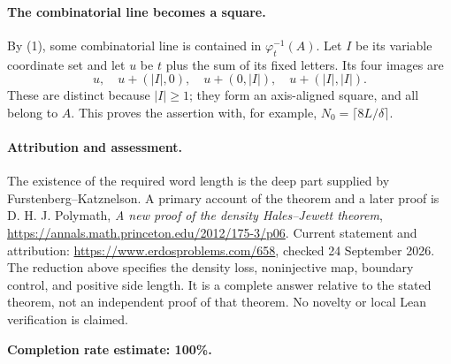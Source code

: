 \paragraph{The combinatorial line becomes a square.}
By (1), some combinatorial line is contained in \(\varphi_t^{-1}(A)\). Let \(I\) be its variable coordinate set and let \(u\) be \(t\) plus the sum of its fixed letters. Its four images are
\[
 u,\quad u+(|I|,0),\quad u+(0,|I|),\quad u+(|I|,|I|).
\]
These are distinct because \(|I|\geq1\); they form an axis-aligned square, and all belong to \(A\). This proves the assertion with, for example, \(N_0=\lceil8L/\delta\rceil\).

\paragraph{Attribution and assessment.}
The existence of the required word length is the deep part supplied by Furstenberg--Katznelson. A primary account of the theorem and a later proof is D. H. J. Polymath, \emph{A new proof of the density Hales--Jewett theorem}, \url{https://annals.math.princeton.edu/2012/175-3/p06}. Current statement and attribution: \url{https://www.erdosproblems.com/658}, checked 24 September 2026. The reduction above specifies the density loss, noninjective map, boundary control, and positive side length. It is a complete answer relative to the stated theorem, not an independent proof of that theorem. No novelty or local Lean verification is claimed.

\textbf{Completion rate estimate: 100\%.}
